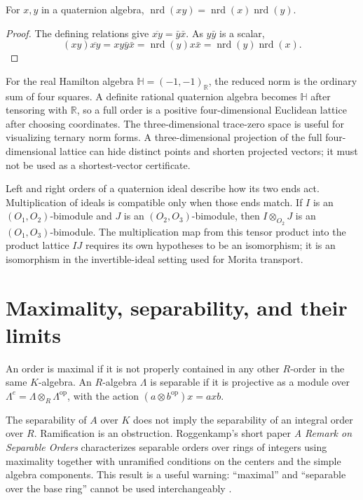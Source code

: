 \begin{proposition}
For $x,y$ in a quaternion algebra,
$\operatorname{nrd}(xy)=\operatorname{nrd}(x)
\operatorname{nrd}(y)$.
\end{proposition}

\begin{proof}
The defining relations give
$\overline{xy}=\bar y\bar x$. As $y\bar y$ is a scalar,
\[
 (xy)\overline{xy}=xy\bar y\bar x
 =\operatorname{nrd}(y)x\bar x
 =\operatorname{nrd}(y)\operatorname{nrd}(x).
\]
\end{proof}

For the real Hamilton algebra $\mathbb H=(-1,-1)_{\mathbb R}$,
the reduced norm is the ordinary sum of four squares. A definite
rational quaternion algebra becomes $\mathbb H$ after tensoring
with $\mathbb R$, so a full order is a positive four-dimensional
Euclidean lattice after choosing coordinates. The three-dimensional
trace-zero space is useful for visualizing ternary norm forms. A
three-dimensional projection of the full four-dimensional lattice
can hide distinct points and shorten projected vectors; it must
not be used as a shortest-vector certificate.

Left and right orders of a quaternion ideal describe how its two
ends act. Multiplication of ideals is compatible only when those
ends match. If $I$ is an $(O_1,O_2)$-bimodule and $J$ is an
$(O_2,O_3)$-bimodule, then $I\otimes_{O_2}J$ is an
$(O_1,O_3)$-bimodule. The multiplication map from this tensor
product into the product lattice $IJ$ requires its own hypotheses
to be an isomorphism; it is an isomorphism in the invertible-ideal
setting used for Morita transport.

\section{Maximality, separability, and their limits}

\begin{definition}
An order is maximal if it is not properly contained in any other
$R$-order in the same $K$-algebra. An $R$-algebra $\Lambda$ is
separable if it is projective as a module over
$\Lambda^e=\Lambda\otimes_R\Lambda^{\mathrm{op}}$, with the
action $(a\otimes b^{\mathrm{op}})x=axb$.
\end{definition}

The separability of $A$ over $K$ does not imply the separability of
an integral order over $R$. Ramification is an obstruction.
Roggenkamp's short paper \emph{A Remark on Separable Orders}
characterizes separable orders over rings of integers using
maximality together with unramified conditions on the centers and
the simple algebra components. This result is a useful warning:
``maximal'' and ``separable over the base ring'' cannot be used
interchangeably \cite{Roggenkamp1969Separable}.

